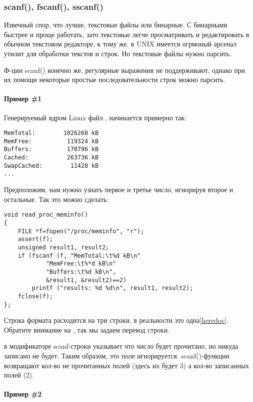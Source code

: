 ﻿\subsubsection{scanf(), fscanf(), sscanf()}

Извечный спор, что лучше, текстовые файлы или бинарные. С бинарными быстрее и проще работать, зато текстовые
легче просматривать и редактировать в обычном текстовом редакторе, к тому же, в UNIX имеется огрмоный арсенал
утилит для обработки текстов и строк. Но текстовые файлы нужно парсить.

Ф-ции scanf()\cite[7.19.6.2]{C99TC3} конечно же, регулярные выражения не поддерживают, 
однако при их помощи некоторые простые последовательности строк можно парсить. 

\paragraph{Пример \#1}

Генерируемый ядром Linux файл , начинается примерно так:

\begin{lstlisting}
MemTotal:        1026268 kB
MemFree:          119324 kB
Buffers:          170796 kB
Cached:           263736 kB
SwapCached:        11428 kB
...
\end{lstlisting}

Предположим, нам нужно узнать первое и третье число, игнорируя второе и остальные.
Так это можно сделать:

\begin{lstlisting}
void read_proc_meminfo()
{
	FILE *f=fopen("/proc/meminfo", "r");
	assert(f);
	unsigned result1, result2;
	if (fscanf (f, "MemTotal:\t%d kB\n"
			"MemFree:\t%*d kB\n"
			"Buffers:\t%d kB\n", 
			&result1, &result2)==2)
		printf ("results: %d %d\n", result1, result2);
	fclose(f);
};
\end{lstlisting}

Строка формата расходится на три строки, в реальности это одна\ref{heredoc}.
Обратите внимание на , так мы задаем перевод строки.

\TT{*} в модификаторе scanf-строки указывает что число будет прочитано, но никуда записано не будет.
Таким образом, это поле игнорируется. scanf()-функции возвращают кол-во не прочитанных полей (здесь
их будет 3) а кол-во записанных полей (2).

\paragraph{Пример \#2}

